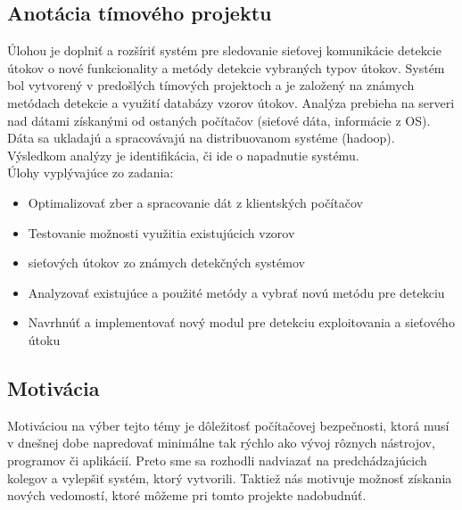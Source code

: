 \documentclass[a4paper,12pt]{article}
\begin{document}
\subsection{Anotácia tímového projektu}
Úlohou je doplniť a rozšíriť systém pre sledovanie sieťovej komunikácie detekcie útokov o nové funkcionality a metódy detekcie vybraných typov útokov. Systém bol vytvorený v predošlých tímových projektoch a je založený na známych metódach detekcie a využití databázy vzorov útokov. Analýza prebieha na serveri nad dátami získanými od ostaných počítačov (sieťové dáta, informácie z OS). Dáta sa ukladajú a spracovávajú na distribuovanom systéme (hadoop). Výsledkom analýzy je identifikácia, či ide o napadnutie systému. \\

Úlohy vyplývajúce zo zadania: 
\begin{itemize}
	\item Optimalizovať zber a spracovanie dát z klientských počítačov 
	\item Testovanie možnosti využitia existujúcich vzorov  \item sieťových útokov zo známych detekčných systémov 
	\item Analyzovať existujúce a použité metódy a vybrať novú metódu pre detekciu 
	\item Navrhnúť a implementovať nový modul pre detekciu exploitovania a sieťového útoku \\
\end{itemize}

\subsection{Motivácia}
Motiváciou na výber tejto témy je dôležitosť počítačovej bezpečnosti, ktorá musí v dnešnej dobe napredovať minimálne tak rýchlo ako vývoj rôznych nástrojov, programov či aplikácií.
Preto sme sa rozhodli nadviazať na predchádzajúcich kolegov a vylepšiť systém, ktorý vytvorili. Taktiež nás motivuje možnosť získania nových vedomostí, ktoré môžeme pri tomto projekte nadobudnúť. \\
\end{document}
